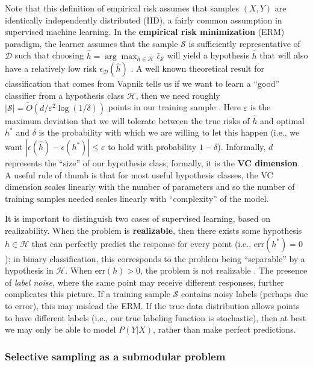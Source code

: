 \noindent Note that this definition of empirical risk assumes that samples $(X, Y)$ are identically independently distributed (IID), a fairly common assumption in supervised machine learning. In the \textbf{empirical risk minimization} (ERM) paradigm, the learner assumes that the sample $\mathcal{S}$ is sufficiently representative of $\mathcal{D}$ such that choosing $\hat{h} = \arg\max_{h \in \mathcal{H}} \hat{\epsilon}_{\mathcal{S}}$ will yield a hypothesis $\hat{h}$ that will also have a relatively low risk $\epsilon_{\mathcal{D}}(\hat{h})$ \cite{Vapnik:2000}. A well known theoretical result for classification that comes from Vapnik tells us if we want to learn a ``good'' classifier from a hypothesis class $\mathcal{H}$, then we need roughly $|\mathcal{S}| = \widetilde{O}\left(d/\varepsilon^2 \log (1/\delta)\right)$ points in our training sample \cite{Vapnik:1999}. Here $\varepsilon$ is the maximum deviation that we will tolerate between the true risks of $\hat{h}$ and optimal $h^\ast$ and $\delta$ is the probability with which we are willing to let this happen (i.e., we want $|\epsilon(\hat{h}) - \epsilon(h^\ast)| \leq \varepsilon$ to hold with probability $1-\delta$). Informally, $d$ represents the ``size'' of our hypothesis class; formally, it is the \textbf{VC dimension}. A useful rule of thumb is that for most useful hypothesis classes, the VC dimension scales linearly with the number of parameters and so the number of training samples needed scales linearly with ``complexity'' of the model.

It is important to distinguish two cases of supervised learning, based on realizability. When the problem is \textbf{realizable}, then there exists some hypothesis $h \in \mathcal{H}$ that can perfectly predict the response for every point (i.e., $\mathrm{err}(h^\ast) = 0$); in binary classification, this corresponds to the problem being ``separable'' by a hypothesis in $\mathcal{H}$. When $\mathrm{err}(h) > 0$, the problem is not realizable \cite{dasgupta2011}. The presence of \textit{label noise}, where the same point may receive different responses, further complicates this picture. If a training sample $\mathcal{S}$ contains noisy labels (perhaps due to error), this may mislead the ERM. If the true data distribution allows points to have different labels (i.e., our true labeling function is stochastic), then at best we may only be able to model $P(Y|X)$, rather than make perfect predictions.

\subsubsection{Selective sampling as a submodular problem}


